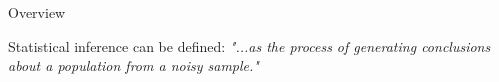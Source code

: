 \documentclass[11pt]{beamer}
\begin{document}
\begin{frame}{
	\begin{minipage}[t]{0.55\textwidth}
		Overview
	\end{minipage}
	\hfill
	\begin{minipage}[t]{0.35\textwidth}
		\flushright
	\end{minipage}
}{}

Statistical inference can be defined: \textit{"...as the process of generating conclusions about a population from a noisy sample."} \parencite{CaffoStatisticalinferencedata2016}

\begin{center}
\end{center}
\end{frame}
\end{document}
